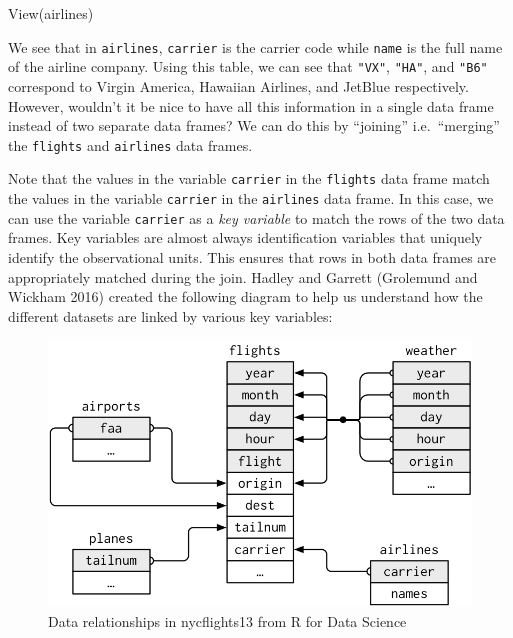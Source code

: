 \documentclass[
  letterpaper,
  DIV=11,
  numbers=noendperiod]{scrreprt}
\newenvironment{Shaded}{\begin{snugshade}}{\end{snugshade}}
\newcommand{\FunctionTok}[1]{\textcolor[rgb]{0.28,0.35,0.67}{#1}}
\newcommand{\NormalTok}[1]{\textcolor[rgb]{0.00,0.23,0.31}{#1}}
\theoremstyle{definition}
\theoremstyle{remark}
\begin{document}
\begin{Shaded}
\begin{Highlighting}[]
\FunctionTok{View}\NormalTok{(airlines)}
\end{Highlighting}
\end{Shaded}

We see that in \texttt{airlines}, \texttt{carrier} is the carrier code
while \texttt{name} is the full name of the airline company. Using this
table, we can see that \texttt{"VX"}, \texttt{"HA"}, and \texttt{"B6"}
correspond to Virgin America, Hawaiian Airlines, and JetBlue
respectively. However, wouldn't it be nice to have all this information
in a single data frame instead of two separate data frames? We can do
this by ``joining'' i.e.~``merging'' the \texttt{flights} and
\texttt{airlines} data frames.

Note that the values in the variable \texttt{carrier} in the
\texttt{flights} data frame match the values in the variable
\texttt{carrier} in the \texttt{airlines} data frame. In this case, we
can use the variable \texttt{carrier} as a \emph{key variable} to match
the rows of the two data frames. Key variables are almost always
identification variables that uniquely identify the observational units.
This ensures that rows in both data frames are appropriately matched
during the join. Hadley and Garrett (Grolemund and Wickham 2016) created
the following diagram to help us understand how the different datasets
are linked by various key variables:

\begin{figure}

{\centering \includegraphics{images/relational-nycflights.png}

}

\caption{\label{fig-flights-key-diagram}Data relationships in
nycflights13 from R for Data Science}

\end{figure}
\end{document}
